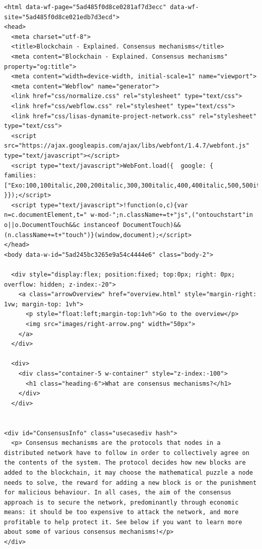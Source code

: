 \begin{lstlisting}
<html data-wf-page="5ad485f0d8ce0281af7d3ecc" data-wf-site="5ad485f0d8ce021edb7d3ecd">
<head>
  <meta charset="utf-8">
  <title>Blockchain - Explained. Consensus mechanisms</title>
  <meta content="Blockchain - Explained. Consensus mechanisms" property="og:title">
  <meta content="width=device-width, initial-scale=1" name="viewport">
  <meta content="Webflow" name="generator">
  <link href="css/normalize.css" rel="stylesheet" type="text/css">
  <link href="css/webflow.css" rel="stylesheet" type="text/css">
  <link href="css/lisas-dynamite-project-network.css" rel="stylesheet" type="text/css">
  <script src="https://ajax.googleapis.com/ajax/libs/webfont/1.4.7/webfont.js" type="text/javascript"></script>
  <script type="text/javascript">WebFont.load({  google: {    families: ["Exo:100,100italic,200,200italic,300,300italic,400,400italic,500,500italic,600,600italic,700,700italic,800,800italic,900,900italic","Roboto:100,100italic,300,300italic,regular,italic,500,500italic,700,700italic,900,900italic"]  }});</script>
  <script type="text/javascript">!function(o,c){var n=c.documentElement,t=" w-mod-";n.className+=t+"js",("ontouchstart"in o||o.DocumentTouch&&c instanceof DocumentTouch)&&(n.className+=t+"touch")}(window,document);</script>
</head>
<body data-w-id="5ad245bc3265e9a54c4444e6" class="body-2">

  <div style="display:flex; position:fixed; top:0px; right: 0px; overflow: hidden; z-index:-20">
    <a class="arrowOverview" href="overview.html" style="margin-right: 1vw; margin-top: 1vh">
      <p style="float:left;margin-top:1vh">Go to the overview</p>
      <img src="images/right-arrow.png" width="50px">
    </a>
  </div>

  <div>
    <div class="container-5 w-container" style="z-index:-100">
      <h1 class="heading-6">What are consensus mechanisms?</h1>
    </div>
  </div>


<div id="ConsensusInfo" class="usecasediv hash">
  <p> Consensus mechanisms are the protocols that nodes in a distributed network have to follow in order to collectively agree on the contents of the system. The protocol decides how new blocks are added to the blockchain, it may choose the mathematical puzzle a node needs to solve, the reward for adding a new block is or the punishment for malicious behaviour. In all cases, the aim of the consensus approach is to secure the network, predominantly through economic means: it should be too expensive to attack the network, and more profitable to help protect it. See below if you want to learn more about some of various consensus mechanisms!</p>
</div>


\end{lstlisting}
